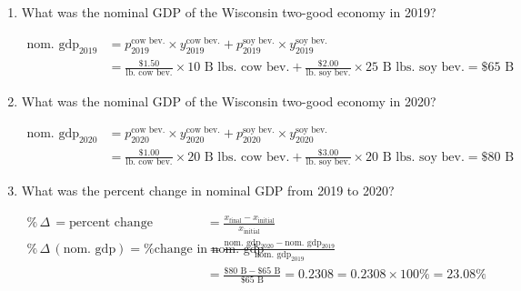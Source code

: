 \documentclass{assignment}
\begin{document}
\begin{enumerate}

\item What was the nominal GDP of the Wisconsin two-good economy in 2019?

\begin{solution}
\vspace{-1.0\baselineskip}
\begin{align*}
\text{nom.~gdp}_{\text{2019}} &= 
p^{\text{cow~bev.}}_{\text{2019}} \times y^{\text{cow~bev.}}_{\text{2019}} +
p^{\text{soy~bev.}}_{\text{2019}} \times y^{\text{soy~bev.}}_{\text{2019}} \\
 &= \frac{\$1.50}{\text{lb.~cow~bev.}} \times 10 \text{~B~lbs.~cow~bev.} + \frac{\$2.00}{\text{lb.~soy~bev.}} \times 25 \text{~B~lbs.~soy~bev.} = \$65 \text{~B}
\end{align*}
\end{solution}

\item What was the nominal GDP of the Wisconsin two-good economy in 2020?

\begin{solution}
\vspace{-1.0\baselineskip}
\begin{align*}
\text{nom.~gdp}_{\text{2020}} &= 
p^{\text{cow~bev.}}_{\text{2020}} \times y^{\text{cow~bev.}}_{\text{2020}} +
p^{\text{soy~bev.}}_{\text{2020}} \times y^{\text{soy~bev.}}_{\text{2020}} \\
 &= \frac{\$1.00}{\text{lb.~cow~bev.}} \times 20 \text{~B~lbs.~cow~bev.} + \frac{\$3.00}{\text{lb.~soy~bev.}} \times 20 \text{~B~lbs.~soy~bev.} = \$80 \text{~B}
\end{align*}
\end{solution}

\item What was the percent change in nominal GDP from 2019 to 2020?

\begin{solution}
\vspace{-1.0\baselineskip}
\begin{align*}
\%\,\Delta\, = \text{percent change} &= \frac{ x_\text{final} - x_\text{initial} }{ x_\text{initial} } \\
\%\,\Delta\,(\text{nom.~gdp}) = \text{\% change in nom.~gdp} &= \frac{\text{nom. gdp}_{\text{2020}} - \text{nom. gdp}_{\text{2019}}}{\text{nom. gdp}_{\text{2019}}} \\
&= \frac{\$80 \text{~B} - \$65 \text{~B}}{\$65 \text{~B}} = 0.2308 = 0.2308 \times 100\% = 23.08\%
\end{align*}
\end{solution}


\end{enumerate}
\end{document}
